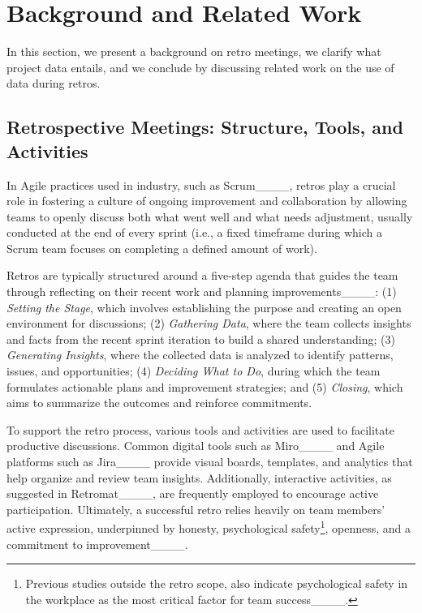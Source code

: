 \section{Background and Related Work}
\label{sec_background}

In this section, we present a background on retro meetings, we clarify what project data entails, and we conclude by discussing related work on the use of data during retros.


\subsection{Retrospective Meetings: Structure, Tools, and Activities}
\label{sec_background_retro}

In Agile practices used in industry, such as Scrum____,  retros play a crucial role in fostering a culture of ongoing improvement and collaboration by allowing teams to openly discuss both what went well and what needs adjustment, usually conducted at the end of every sprint (i.e., a fixed timeframe during which a Scrum team focuses on completing a defined amount of work).

Retros are typically structured around a five-step agenda that guides the team through reflecting on their recent work and planning improvements____: (1) \textit{Setting the Stage}, which involves establishing the purpose and creating an open environment for discussions; (2) \textit{Gathering Data}, where the team collects insights and facts from the recent sprint iteration to build a shared understanding; (3) \textit{Generating Insights}, where the collected data is analyzed to identify patterns, issues, and opportunities; (4) \textit{Deciding What to Do}, during which the team formulates actionable plans and improvement strategies; and (5) \textit{Closing}, which aims to summarize the outcomes and reinforce commitments. 

To support the retro process, various tools and activities are used to facilitate productive discussions. Common digital tools such as Miro____ and Agile platforms such as Jira____ provide visual boards, templates, and analytics that help organize and review team insights. Additionally, interactive activities, as suggested in Retromat____, are frequently employed to encourage active participation. Ultimately, a successful retro relies heavily on team members’ active expression, underpinned by honesty, psychological safety\footnote{Previous studies outside the retro scope, also indicate psychological safety in the workplace as the most critical factor for team success____.}, openness, and a commitment to improvement____.


